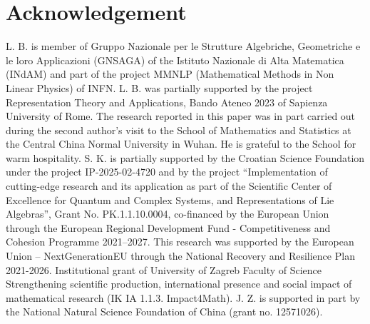 \documentclass[12pt,a4paper,reqno]{amsart}
\theoremstyle{stil}
\theoremstyle{defi}
\theoremstyle{defi}
\theoremstyle{stil}
\theoremstyle{stil}
\theoremstyle{stil}
\theoremstyle{prim}
\begin{document}
\section*{Acknowledgement} 
L. B. is member of Gruppo Nazionale per le Strutture Algebriche, Geometriche e le loro Applicazioni  (GNSAGA) of the Istituto Nazionale di Alta Matematica (INdAM) and part of the project MMNLP (Mathematical Methods in Non Linear Physics) of INFN.
L. B. was partially supported by the project Representation Theory and Applications, Bando Ateneo 2023 of Sapienza University of Rome.
The research reported in this paper was in part carried out during the second author’s visit to the School of Mathematics and Statistics at the Central China Normal University in Wuhan. He is grateful to the School for warm hospitality.
S. K. is partially supported by the Croatian Science Foundation under the project IP-2025-02-4720  and by the project ``Implementation of cutting-edge research and its application as part of the Scientific Center of Excellence for Quantum and Complex Systems, and Representations of Lie Algebras'', Grant No. PK.1.1.10.0004, co-financed by the European Union through the European Regional Development Fund - Competitiveness and Cohesion Programme 2021--2027.
This research was supported by the European Union -- NextGenerationEU through the National Recovery and Resilience Plan 2021-2026. Institutional grant of University of Zagreb Faculty of Science Strengthening scientific production, international presence and social impact of mathematical research (IK IA 1.1.3. Impact4Math). 
J. Z. is supported in part by the National Natural Science Foundation of China (grant no. 12571026).
 
\end{document}
